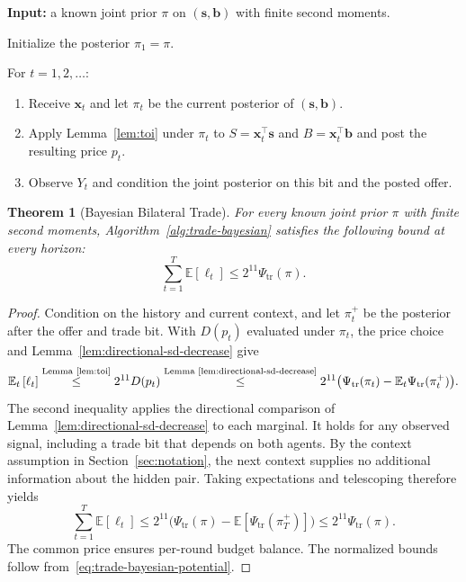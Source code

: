 \documentclass[11pt]{article}
\newtheorem{theorem}{Theorem}[section]
\newcommand{\E}[1]{\mathbb E\left[#1\right]}
\newcommand{\Esub}[2]{\mathbb E_{#1}\left[#2\right]}
\newcommand{\Et}{\mathbb E_t}
\newcommand{\bs}{\boldsymbol s}
\newcommand{\bb}{\boldsymbol b}
\newcommand{\bx}{\boldsymbol x}
\begin{document}
\begin{algorithm}[H]
\caption{Bayesian Contextual Bilateral Trade}\label{alg:trade-bayesian}
\vspace{3pt}
\textbf{Input:} a known joint prior $\pi$ on $(\bs,\bb)$ with finite second moments.

Initialize the posterior $\pi_1 = \pi$.

For $t=1,2,\ldots$:
\begin{enumerate}
 \item Receive $\bx_t$ and let $\pi_t$ be the current posterior of $(\bs,\bb)$.
 \item Apply Lemma~\ref{lem:toi} under $\pi_t$ to
 $S=\bx_t^\top \bs$ and $B=\bx_t^\top \bb$ and post the resulting price $p_t$.
 \item Observe $Y_t$ and condition the joint posterior on this bit and the posted offer.
\end{enumerate}
\end{algorithm}

\begin{theorem}[Bayesian Bilateral Trade]\label{thm:trade-bayes}
For every known joint prior $\pi$ with finite second moments, Algorithm~\ref{alg:trade-bayesian} satisfies {the following bound at every horizon:}
\begin{equation}\label{eq:trade-bayesian-guarantee}
 \sum_{t=1}^T \E{ \ell_t}\le2^{11}\Psi_{\mathrm{tr}}(\pi).
\end{equation}
\end{theorem}

\begin{proof} Condition on the history and current context, and let $\pi_t^+$ be the posterior after the offer and trade bit. With $D(p_t)$ evaluated under $\pi_t$, the price choice and Lemma~\ref{lem:directional-sd-decrease} give
\begin{equation}\label{eq:trade-round}
 \Esub{t}{\ell_t}
 \overset{\text{Lemma~\ref{lem:toi}}}{\le}2^{11}D(p_t)
 \overset{\text{Lemma~\ref{lem:directional-sd-decrease}}}{\le}
 2^{11}\bigl(\Psi_{\mathrm{tr}}(\pi_t)-\Et\Psi_{\mathrm{tr}}(\pi_t^+)\bigr).
\end{equation}
The second inequality applies the directional comparison of Lemma~\ref{lem:directional-sd-decrease} to each marginal. It holds for any observed signal, including a trade bit that depends on both agents. By the context assumption in Section~\ref{sec:notation}, the next context supplies no additional information about the hidden pair. Taking expectations and telescoping therefore yields
\[
 \sum_{t=1}^T\E{\ell_t}
 \le2^{11}\bigl(\Psi_{\mathrm{tr}}(\pi)-\E{\Psi_{\mathrm{tr}}(\pi_T^+)}\bigr)
 \le2^{11}\Psi_{\mathrm{tr}}(\pi).
\]
The common price ensures per-round budget balance. The normalized bounds follow from~\eqref{eq:trade-bayesian-potential}.
\end{proof}
\end{document}
